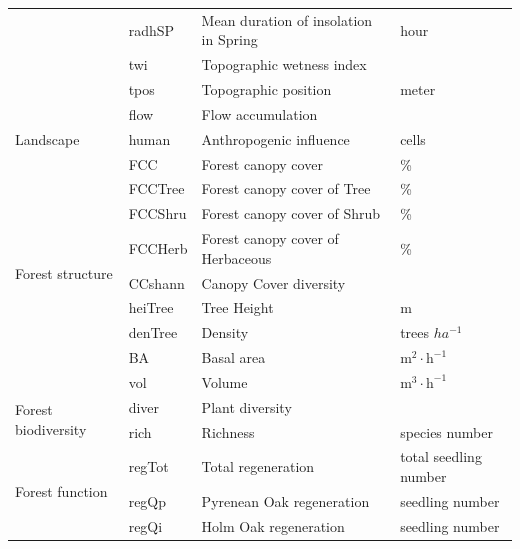\begin{table}[H]
\begin{tabular}{llll}
 & radhSP & Mean duration of insolation in Spring & hour \\
 & twi & Topographic wetness index &  \\
 & tpos & Topographic position & meter \\
 & flow & Flow accumulation &  \\ 
\hline
Landscape & human & Anthropogenic influence & cells \\ 
\hline
\multirow{9}{*}{Forest structure} & FCC & Forest canopy cover & \% \\
 & FCCTree & Forest canopy cover of Tree & \% \\
 & FCCShru & Forest canopy cover of Shrub & \% \\
 & FCCHerb & Forest canopy cover of Herbaceous & \% \\
 & CCshann & Canopy Cover diversity &  \\
 & heiTree & Tree Height & m \\
 & denTree & Density & trees $ha^{-1}$ \\
 & BA & Basal area & $\mathrm{m^2 \cdot h^{-1}}$ \\
 & vol & Volume & $\mathrm{m^3 \cdot h^{-1}}$\\ 
\hline
\multirow{2}{*}{Forest biodiversity} & diver & Plant diversity &  \\
 & rich & Richness & species number \\ 
\hline
\multirow{3}{*}{Forest function} & regTot & Total regeneration & total seedling number \\
 & regQp & Pyrenean Oak regeneration & seedling number \\
 & regQi & Holm Oak regeneration & seedling number \\
\hline
\end{tabular}
\endgroup{}
\end{table}

